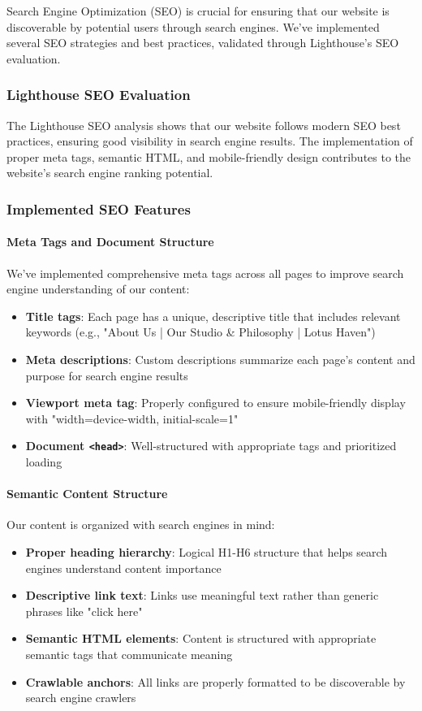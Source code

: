 Search Engine Optimization (SEO) is crucial for ensuring that our website is discoverable by potential users through search engines. We've implemented several SEO strategies and best practices, validated through Lighthouse's SEO evaluation.

\subsubsection{Lighthouse SEO Evaluation}

The Lighthouse SEO analysis shows that our website follows modern SEO best practices, ensuring good visibility in search engine results. The implementation of proper meta tags, semantic HTML, and mobile-friendly design contributes to the website's search engine ranking potential.

\subsubsection{Implemented SEO Features}

\paragraph{Meta Tags and Document Structure}
We've implemented comprehensive meta tags across all pages to improve search engine understanding of our content:

\begin{itemize}
    \item \textbf{Title tags}: Each page has a unique, descriptive title that includes relevant keywords (e.g., "About Us | Our Studio \& Philosophy | Lotus Haven")
    \item \textbf{Meta descriptions}: Custom descriptions summarize each page's content and purpose for search engine results
    \item \textbf{Viewport meta tag}: Properly configured to ensure mobile-friendly display with "width=device-width, initial-scale=1"
    \item \textbf{Document \texttt{<head>}}: Well-structured with appropriate tags and prioritized loading
\end{itemize}

\paragraph{Semantic Content Structure}
Our content is organized with search engines in mind:

\begin{itemize}
    \item \textbf{Proper heading hierarchy}: Logical H1-H6 structure that helps search engines understand content importance
    \item \textbf{Descriptive link text}: Links use meaningful text rather than generic phrases like "click here"
    \item \textbf{Semantic HTML elements}: Content is structured with appropriate semantic tags that communicate meaning
    \item \textbf{Crawlable anchors}: All links are properly formatted to be discoverable by search engine crawlers
\end{itemize}

